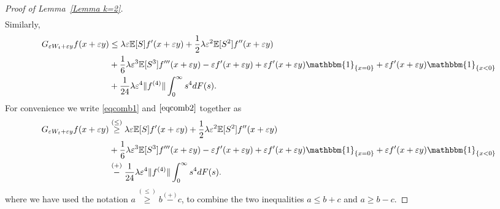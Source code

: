 \documentclass[11pt,letterpaper,reqno]{article}
\theoremstyle{thmstyleone}%
\theoremstyle{thmstyletwo}%
\theoremstyle{thmstylethree}%
\numberwithin{equation}{section}
\begin{document}
\begin{proof}[Proof of Lemma~\ref{Lemma k=2}]
\begin{align}
\end{align}
Similarly,
\begin{align}\label{eqcomb2}
    G_{\varepsilon W_t+\varepsilon y}f(x+\varepsilon y)
      &\leq \lambda \varepsilon \mathbb E[S]f'(x+\varepsilon y)+\frac{1}{2}\lambda \varepsilon^2 \mathbb E[S^2]f''(x+\varepsilon y) \nonumber \\
     &+\frac{1}{6}\lambda \varepsilon^3 \mathbb E[S^3]f'''(x+\varepsilon y)-\varepsilon f'(x+\varepsilon y)+\varepsilon f'(x+\varepsilon y)\mathbbm{1}_{\{x=0\}}+\varepsilon f'(x+\varepsilon y)\mathbbm{1}_{\{x<0\}}\nonumber \\
     &+\frac{1}{24}\lambda \varepsilon^4  \|f^{(4)}\|\int_0^\infty s^4 dF(s).
\end{align}
For convenience we write \eqref{eqcomb1} and $\eqref{eqcomb2}$ together as 
\begin{align}\label{eqcomb2.1}
       G_{\varepsilon W_t+\varepsilon y}f(x+\varepsilon y) 
     &\stackrel{(\leq)}{\geq} \lambda \varepsilon \mathbb E[S]f'(x+\varepsilon y)+\frac{1}{2}\lambda \varepsilon^2 \mathbb E[S^2]f''(x+\varepsilon y)\nonumber \\
     &+\frac{1}{6}\lambda \varepsilon^3 \mathbb E[S^3]f'''(x+\varepsilon y)-\varepsilon f'(x+\varepsilon y)+\varepsilon f'(x+\varepsilon y)\mathbbm{1}_{\{x=0\}}+\varepsilon f'(x+\varepsilon y)\mathbbm{1}_{\{x<0\}}\nonumber \\
     &\stackrel{(+)}{-}\frac{1}{24}\lambda \varepsilon^4  \|f^{(4)}\|\int_0^\infty s^4 dF(s).
\end{align}
where we have used the notation $a \stackrel{(\leq)}{\geq} b \stackrel{(+)}{-} c$, to combine the two inequalities $a \leq b+c$ and $a \geq b-c$.


\end{proof}
\end{document}
